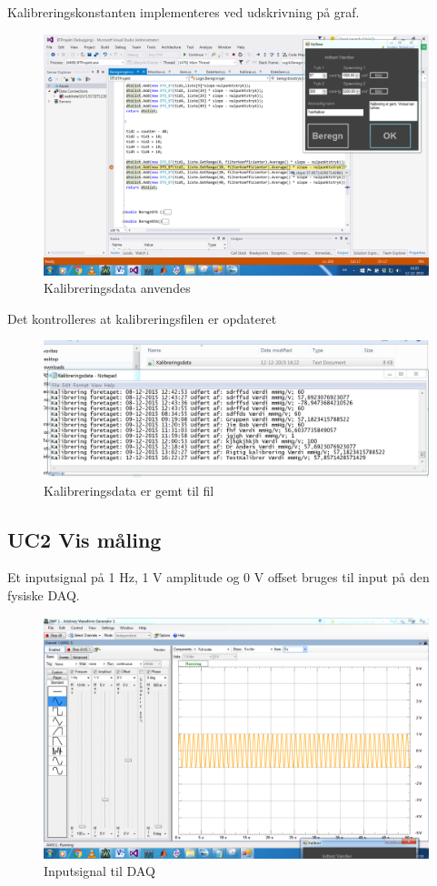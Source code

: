 Kalibreringskonstanten implementeres ved udskrivning på graf.
\begin{figure}[H]
	\centering
	\includegraphics[width=1\textwidth]{Figurer/Test_Kalibrer_3}
	\caption{Kalibreringsdata anvendes}
\end{figure}
Det kontrolleres at kalibreringsfilen er opdateret
\begin{figure}[H]
	\centering
	\includegraphics[width=1\textwidth]{Figurer/Test_Kalibrer_4}
	\caption{Kalibreringsdata er gemt til fil}
\end{figure}

\subsection{UC2 Vis måling}
Et inputsignal på 1 Hz, 1 V amplitude og 0 V offset bruges til input på den fysiske DAQ. 
\begin{figure}[H]
	\centering
	\includegraphics[width=1\textwidth]{Figurer/Test_Vis_1}
	\caption{Inputsignal til DAQ}
\end{figure}

